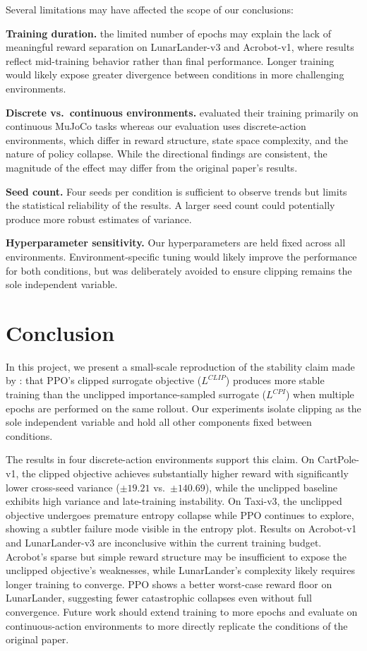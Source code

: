\documentclass{article}
\begin{document}
Several limitations may have affected the scope of our conclusions:

\textbf{Training duration.} the limited number of epochs may explain the lack of meaningful reward separation on LunarLander-v3 and Acrobot-v1, where results reflect mid-training behavior rather than final performance. Longer training would likely expose greater divergence between conditions in more challenging environments.

\textbf{Discrete vs.\ continuous environments.} \citet{schulman2017ppo} evaluated their training primarily on continuous MuJoCo tasks whereas our evaluation uses discrete-action environments, which differ in reward structure, state space complexity, and the nature of policy collapse. While the directional findings are consistent, the magnitude of the effect may differ from the original paper's results.

\textbf{Seed count.} Four seeds per condition is sufficient to observe trends but limits the statistical reliability of the results. A larger seed count could potentially produce more robust estimates of variance.

\textbf{Hyperparameter sensitivity.} Our hyperparameters are held fixed across all environments. Environment-specific tuning would likely improve the performance for both conditions, but was deliberately avoided to ensure clipping remains the sole independent variable.


\section{Conclusion}

In this project, we present a small-scale reproduction of the stability claim made by \citet{schulman2017ppo}: that PPO's clipped surrogate objective ($L^{CLIP}$) produces more stable training than the unclipped importance-sampled surrogate ($L^{CPI}$) when multiple epochs are performed on the same rollout. Our experiments isolate clipping as the sole independent variable and hold all other components fixed between conditions.

The results in four discrete-action environments support this claim. On CartPole-v1, the clipped objective achieves substantially higher reward with significantly lower cross-seed variance ($\pm 19.21$ vs.\ $\pm 140.69$), while the unclipped baseline exhibits high variance and late-training instability. On Taxi-v3, the unclipped objective undergoes premature entropy collapse while PPO continues to explore, showing a subtler failure mode visible in the entropy plot. Results on Acrobot-v1 and LunarLander-v3 are inconclusive within the current training budget. Acrobot's sparse but simple reward structure may be insufficient to expose the unclipped objective's weaknesses, while LunarLander's complexity likely requires longer training to converge. PPO shows a better worst-case reward floor on LunarLander, suggesting fewer catastrophic collapses even without full convergence. Future work should extend training to more epochs and evaluate on continuous-action environments to more directly replicate the conditions of the original paper.
\end{document}
